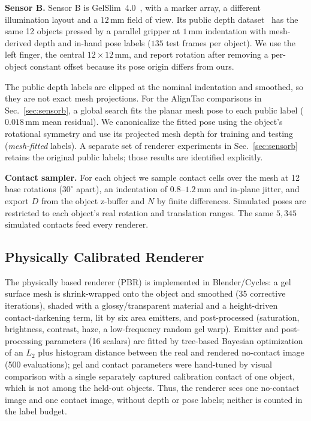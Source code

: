 \noindent\textbf{Sensor B.} Sensor B is GelSlim~4.0~\cite{sipos2024gelslim4}, with a marker array, a different illumination layout and a $12\,$mm field of view. Its public depth dataset~\cite{sipos2024gelslim4} has the same 12 objects pressed by a parallel gripper at $1\,$mm indentation with mesh-derived depth and in-hand pose labels ($135$ test frames per object). We use the left finger, the central $12\times12\,$mm, and report rotation after removing a per-object constant offset because its pose origin differs from ours.

The public depth labels are clipped at the nominal indentation and smoothed, so they are not exact mesh projections. For the AlignTac comparisons in Sec.~\ref{sec:sensorb}, a global search fits the planar mesh pose to each public label ($0.018\,$mm mean residual). We canonicalize the fitted pose using the object's rotational symmetry and use its projected mesh depth for training and testing (\emph{mesh-fitted} labels). A separate set of renderer experiments in Sec.~\ref{sec:sensorb} retains the original public labels; those results are identified explicitly.

\noindent\textbf{Contact sampler.} For each object we sample contact cells over the mesh at 12 base rotations ($30^\circ$ apart), an indentation of $0.8$--$1.2\,$mm and in-plane jitter, and export $D$ from the object z-buffer and $N$ by finite differences. Simulated poses are restricted to each object's real rotation and translation ranges. The same $5{,}345$ simulated contacts feed every renderer.

\subsection{Physically Calibrated Renderer}
\label{sec:blender}
The physically based renderer (PBR) is implemented in Blender/Cycles: a gel surface mesh is shrink-wrapped onto the object and smoothed (35 corrective iterations), shaded with a glossy/transparent material and a height-driven contact-darkening term, lit by six area emitters, and post-processed (saturation, brightness, contrast, haze, a low-frequency random gel warp). Emitter and post-processing parameters (16 scalars) are fitted by tree-based Bayesian optimization of an $L_2$ plus histogram distance between the real and rendered no-contact image (500 evaluations); gel and contact parameters were hand-tuned by visual comparison with a single separately captured calibration contact of one object, which is not among the held-out objects. Thus, the renderer sees one no-contact image and one contact image, without depth or pose labels; neither is counted in the label budget.

